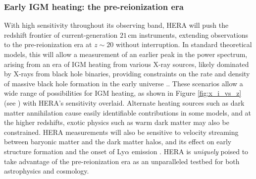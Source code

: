\documentclass[preprint]{aastex}
\newcommand{\compress}{\vspace{-0.3in}}
\begin{document}

\compress
\subsubsection{Early IGM heating: the pre-reionization era}

With high sensitivity throughout its observing band, HERA will push the redshift
frontier of current-generation $21\,\textrm{cm}$ instruments, extending observations to the pre-reionization era  at $z \sim 20$ without interruption.  In standard theoretical models, this will allow a measurement of an earlier peak in the power
spectrum, arising from an era of IGM heating from various X-ray sources, likely dominated by X-rays from black
hole binaries, providing constraints on the rate and density of massive black hole formation in the early universe \citep{pritchard_loeb2010}..  These scenarios allow a wide range of possibilities for IGM heating, as shown in Figure \ref{fig:x_i_vs_z} (see  \citealt{mesinger_et_al2013}) with HERA's sensitivity overlaid.
Alternate heating sources such as dark matter annihilation cause easily identifiable contributions in some models, and at the higher redshifts, exotic physics such as warm dark matter may also be constrained.  HERA measurements will also be sensitive to velocity streaming between baryonic matter and the dark matter halos, and its effect on early structure formation and the onset of Ly$\alpha$ emission \citep{visbal_et_al2012}.  HERA is \emph{uniquely} poised to take advantage of the pre-reionization era as an unparalleled testbed for both astrophysics and cosmology.
\end{document}
